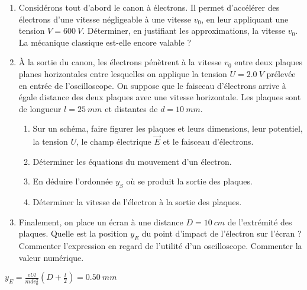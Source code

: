 \begin{enumerate}
	\item Considérons tout d'abord le canon à électrons. Il permet d'accélérer des électrons d'une vitesse négligeable à une vitesse $v_0$, en leur appliquant une tension $V = \SI{600}{V}$. Déterminer, en justifiant les approximations, la vitesse $v_0$. La mécanique classique est-elle encore valable ?
	
	\item À la sortie du canon, les électrons pénètrent à la vitesse $v_0$ entre deux plaques planes horizontales entre lesquelles on applique la tension $U=\SI{2.0}{V}$ prélevée en entrée de l'oscilloscope. On suppose que le faisceau d'électrons arrive à égale distance des deux plaques avec une vitesse horizontale. Les plaques sont de longueur $l = \SI{25}{mm}$ et distantes de $d = \SI{10}{mm}$. 
	\begin{enumerate}
		\item Sur un schéma, faire figurer les plaques et leurs dimensions, leur potentiel, la tension $U$, le champ électrique $\vec{E}$ et le faisceau d'électrons.
		\item Déterminer les équations du mouvement d'un électron.
		\item En déduire l'ordonnée $y_S$ où se produit la sortie des plaques.
		\item Déterminer la vitesse de l'électron à la sortie des plaques.
	\end{enumerate}
	
	\item Finalement, on place un écran à une distance $D = \SI{10}{cm}$ de l'extrémité des plaques. Quelle est la position $y_E$ du point d'impact de l'électron sur l'écran ? Commenter l'expression en regard de l'utilité d'un oscilloscope. Commenter la valeur numérique.

\end{enumerate}

 $y_E = \frac{e U l}{m d v_0^2}\left(D + \frac{l}{2}\right) = \SI{0.50}{mm}$